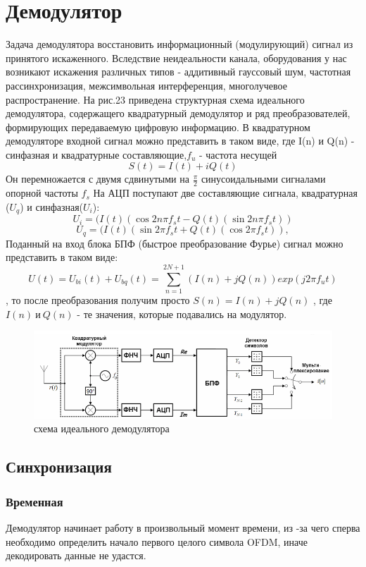 \section{Демодулятор}
Задача демодулятора восстановить информационный (модулирующий) сигнал из принятого искаженного. Вследствие неидеальности канала, оборудования у нас возникают искажения различных типов - аддитивный гауссовый шум, частотная рассинхронизация, межсимвольная интерференция, многолучевое распространение.
На рис.23 приведена структурная схема идеального демодулятора, содержащего квадратурный демодулятор и ряд преобразователей, формирующих передаваемую цифровую информацию.
В квадратурном демодуляторе входной сигнал можно представить в таком виде, где I(n)  и Q(n)  - синфазная и квадратурные составляющие,$f_u$ - частота несущей $$S(t)  = I(t)+ iQ(t) $$
 Он перемножается с двумя
сдвинутыми на $ \frac {\pi}{2}$ синусоидальными сигналами опорной частоты $f_s$ 
На АЦП поступают две составляющие сигнала, квадратурная (${U_q}$) и синфазная(${U_i}$): $$U_{i} = (I(t)(\cos{2 n \pi f_s t} - Q(t)(\sin{2 n \pi f_s t} ) )$$$$U_{q} =(I(t)(\sin{2\pi f_s t} + Q(t)(\cos{2 \pi f_s t} ) ), 
$$
Поданный на вход блока БПФ (быстрое преобразование Фурье) сигнал можно представить в таком виде:  $$U(t) = U_{bi}(t) + U_{bq}(t) = \sum_{n=1}^{2N+1}(I(n) + j Q(n))exp(j2\pi f_u t)$$, то после преобразования получим просто $S(n) = I(n) + j Q(n)$ , где $I(n)\ и\ Q(n)$ - те значения, которые подавались на модулятор.
\begin{figure}[h]
\includegraphics{demod}
\caption{схема идеального демодулятора}
\end{figure}


\subsection{Синхронизация}



\subsubsection{Временная}
Демодулятор начинает работу в произвольный момент времени, из -за чего сперва необходимо определить начало первого целого символа  OFDM, иначе декодировать данные не удастся.

